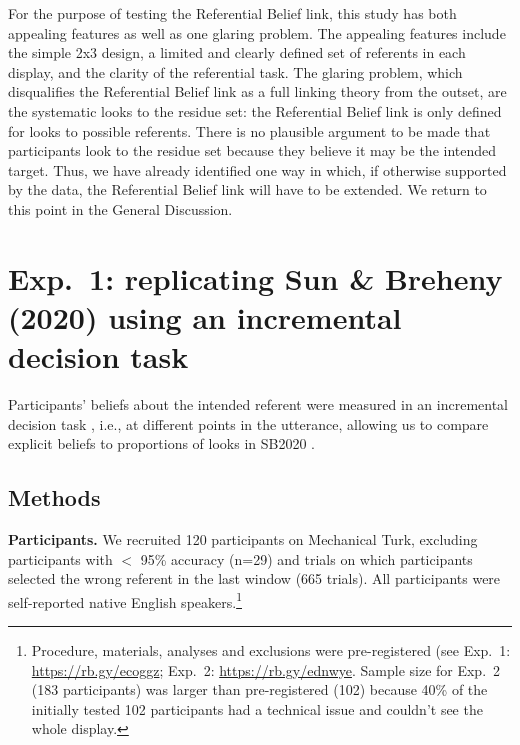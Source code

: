 \documentclass[10pt,letterpaper]{article}
\begin{document}
For the purpose of testing the Referential Belief link, this study has both appealing features as well as one glaring problem. The appealing features include the simple 2x3 design, a limited and clearly defined set of referents in each display, and the clarity of the referential task. The glaring problem, which disqualifies the Referential Belief link as a full linking theory from the outset, are the systematic looks to the residue set: the Referential Belief link is only defined for looks to possible referents. There is no plausible argument to be made that participants look to the residue set because they believe it may be the intended target.  Thus, we have already identified one way in which, if otherwise supported by the data, the Referential Belief link will have to be extended. We return to this point in the General Discussion.


\section{Exp.~1: replicating Sun \& Breheny (2020) using an incremental decision task}

Participants' beliefs about the intended referent were measured in  an incremental decision task \cite{Allopenna1998,QingLD2018, KreissDegen2020,alsop2018}, i.e., at different points in the utterance, allowing us to compare explicit beliefs to proportions of looks in SB2020 . 

\subsection{Methods}

\textbf{Participants.} We recruited 120 participants on Mechanical Turk, excluding participants with $<$ 95\% accuracy (n=29) and trials on which participants selected the wrong referent in the last window (665 trials). All participants were self-reported native English speakers.\footnote{Procedure, materials, analyses and exclusions were pre-registered (see Exp.~1: \url{https://rb.gy/ecoggz}; Exp.~2: \url{https://rb.gy/ednwye}. Sample size for Exp.~2 (183 participants) was larger than pre-registered (102) because 40\% of the initially tested 102 participants had a technical issue and couldn't see the whole display.}
\end{document}
